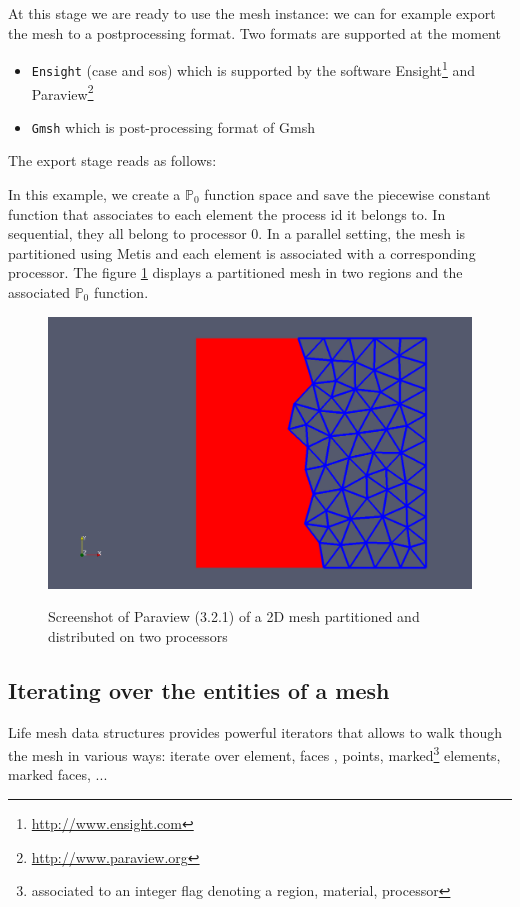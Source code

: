 \documentclass[a4paper]{book}
\newcommand{\polyP}[1]{\ensuremath{\mathbb{P}_{#1}}\xspace}
\begin{document}



At this stage we are ready to use the mesh instance: we can for
example export the mesh to a postprocessing format. Two formats are
supported at the moment
\begin{itemize}
\item \lstinline!Ensight! (case and sos) which is supported by the
  software Ensight\footnote{\url{http://www.ensight.com}} and
  Paraview\footnote{\url{http://www.paraview.org}}
\item \lstinline!Gmsh! which is post-processing format of Gmsh
\end{itemize}

The export stage reads as follows:



In this example, we create a $\polyP{0}$ function space and save the
piecewise constant function that associates to each element the
process id it belongs to. In sequential, they all belong to processor
0.  In a parallel setting, the mesh is partitioned using Metis and
each element is associated with a corresponding processor. The figure
\ref{fig:1} displays a partitioned mesh in two regions and the
associated $\polyP{0}$ function.

\begin{figure}[htbp]
  \centering
  \includegraphics[width=.7\linewidth]{mymeshpartition}
  \label{fig:1}
  \caption{Screenshot of Paraview (3.2.1) of a 2D mesh partitioned and distributed on two processors}
\end{figure}


\subsection{Iterating over the entities of a mesh}

Life mesh data structures provides powerful iterators that allows to
walk though the mesh in various ways: iterate over element, faces ,
points, marked\footnote{associated to an integer flag denoting a
  region, material, processor} elements, marked faces, ...
\end{document}
